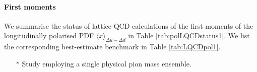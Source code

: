 \paragraph{First moments} We summarise the status of lattice-QCD calculations of the
first moments of the longitudinally polarised PDF $\langle x \rangle_{\Delta u - \Delta d}$ in Table \ref{tab:polLQCDstatus1}. We
list the corresponding best-estimate benchmark in Table \ref{tab:LQCDpol1}.
\begin{table}
\renewcommand{\arraystretch}{1.2} 
\centering
{} %
\begin{minipage}{\linewidth}
{\footnotesize 
\begin{itemize}
\item[$*$] Study employing a single physical pion mass ensemble.
\end{itemize}
}
\end{minipage}
\caption{Summary of the current status of lattice-QCD calculations of moments of longitudinally polarised PDFs.}
\label{tab:polLQCDstatus1}
\end{table}
